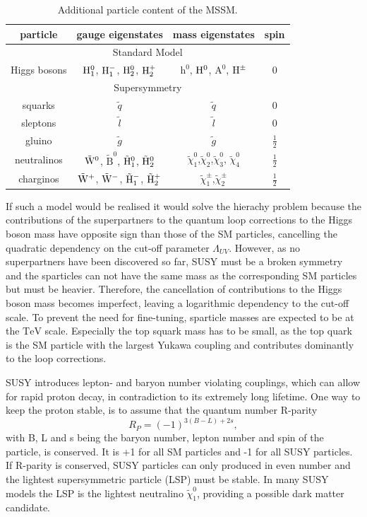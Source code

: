 \begin{table}
\centering
 \renewcommand{\arraystretch}{1.3}
\caption{Additional particle content of the MSSM.}
\label{tab:MSSM}
\begin{tabular}{c|c|c|c}
particle & gauge eigenstates  & mass eigenstates & spin   \\
\hline
\multicolumn{4}{c}{Standard Model} \\
\hline
Higgs bosons & $\mathrm{H}_1^0$, $\mathrm{H}_1^{-}$, $\mathrm{H}_2^0$, $\mathrm{H}_2^+$ & $\mathrm{h}^0$, $\mathrm{H}^0$, $\mathrm{A}^0$, $\mathrm{H}^{\pm}$ & 0 \\
\hline
\multicolumn{4}{c}{Supersymmetry} \\
\hline
squarks & $\tilde{q}$ & $\tilde{q}$ & 0 \\
sleptons & $\tilde{l}$ & $\tilde{l}$ & 0 \\
 gluino & $\tilde{g}$ & $\tilde{g}$ & $\frac{1}{2}$ \\
neutralinos & $\tilde{\mathrm{W}}^0$, $\tilde{\mathrm{B}}^0$, $\tilde{\mathrm{H}}_1^0$, $\tilde{\mathrm{H}}_2^0$ & $\tilde{\chi}^0_1$,$\tilde{\chi}^0_2$,$\tilde{\chi}^0_3$, $\tilde{\chi}^0_4$ & $\frac{1}{2}$\\
charginos & $\tilde{\mathrm{W}}^+$, $\tilde{\mathrm{W}}^-$, $\tilde{\mathrm{H}}_1^-$, $\tilde{\mathrm{H}}_2^+$ & $\tilde{\chi}^{\pm}_1$,$\tilde{\chi}^{\pm}_2$ & $\frac{1}{2}$ \\ 
\end{tabular}
\end{table} 

If such a model would be realised it would solve the hierachy problem because the contributions of the superpartners to the quantum loop corrections to the Higgs boson mass have opposite sign than those of the SM particles, cancelling the quadratic dependency on the cut-off parameter $\Lambda_{UV}$. However, as no superpartners have been discovered so far, SUSY must be a broken symmetry and the sparticles can not have the same mass as the corresponding SM particles but must be heavier. Therefore, the cancellation of contributions to the Higgs boson mass becomes imperfect, leaving a logarithmic dependency to the cut-off scale. To prevent the need for fine-tuning, sparticle masses are expected to be at the $\mathrm{TeV}$ scale. Especially the top squark mass has to be small, as the top quark is the SM particle with the largest Yukawa coupling and contributes dominantly to the loop corrections. 

SUSY introduces lepton- and baryon number violating couplings, which can allow for rapid proton decay, in contradiction to its extremely long lifetime. One way to keep the proton stable, is to assume that the quantum number R-parity
\begin{equation}
R_P = (-1)^{3(B-L)+2s},
\end{equation} 
with B, L and s being the baryon number, lepton number and spin of the particle, is conserved. It is +1 for all SM particles and -1 for all SUSY particles. If R-parity is conserved, SUSY particles can only produced in even number and the lightest supersymmetric particle (LSP) must be stable. In many SUSY models the LSP is the lightest neutralino $\tilde{\chi}^0_1$, providing a possible dark matter candidate. 


